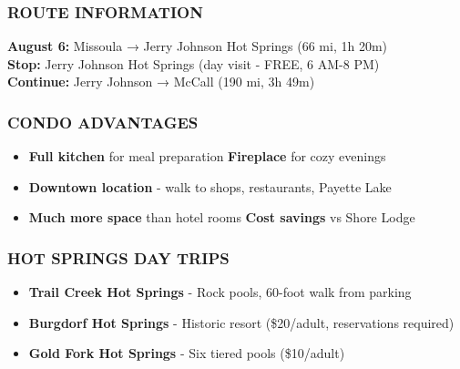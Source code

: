 \documentclass[
  10pt,
]{article}
\providecommand{\tightlist}{%
  \setlength{\itemsep}{0pt}\setlength{\parskip}{0pt}}
\begin{document}
\subsubsection{\texorpdfstring{\textcolor{primary}{ROUTE INFORMATION}}{}}\label{section-20}

\textbf{\textcolor{secondary}{August 6:}} Missoula → Jerry Johnson Hot
Springs (66 mi, 1h 20m)\\
\textbf{\textcolor{secondary}{Stop:}} Jerry Johnson Hot Springs (day
visit - FREE, 6 AM-8 PM)\\
\textbf{\textcolor{secondary}{Continue:}} Jerry Johnson → McCall (190
mi, 3h 49m)

\subsubsection{\texorpdfstring{\textcolor{primary}{CONDO ADVANTAGES}}{}}\label{section-21}

\begin{itemize}
\tightlist
\item
  \textbf{\textcolor{secondary}{Full kitchen}} for meal preparation
  \textbar{} \textbf{\textcolor{secondary}{Fireplace}} for cozy
  evenings\\
\item
  \textbf{\textcolor{secondary}{Downtown location}} - walk to shops,
  restaurants, Payette Lake\\
\item
  \textbf{\textcolor{secondary}{Much more space}} than hotel rooms
  \textbar{} \textbf{\textcolor{secondary}{Cost savings}} vs Shore Lodge
\end{itemize}

\subsubsection{\texorpdfstring{\textcolor{primary}{HOT SPRINGS DAY TRIPS}}{}}\label{section-22}

\begin{itemize}
\tightlist
\item
  \textbf{\textcolor{secondary}{Trail Creek Hot Springs}} - Rock pools,
  60-foot walk from parking
\item
  \textbf{\textcolor{secondary}{Burgdorf Hot Springs}} - Historic resort
  (\$20/adult, reservations required)
\item
  \textbf{\textcolor{secondary}{Gold Fork Hot Springs}} - Six tiered
  pools (\$10/adult)
\end{itemize}
\end{document}
